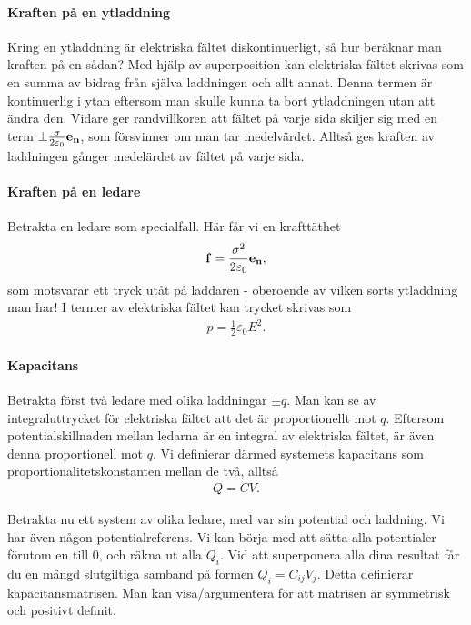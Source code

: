 \paragraph{Kraften på en ytladdning}
Kring en ytladdning är elektriska fältet diskontinuerligt, så hur beräknar man kraften på en sådan? Med hjälp av superposition kan elektriska fältet skrivas som en summa av bidrag från själva laddningen och allt annat. Denna termen är kontinuerlig i ytan eftersom man skulle kunna ta bort ytladdningen utan att ändra den. Vidare ger randvillkoren att fältet på varje sida skiljer sig med en term $\pm\frac{\sigma}{2\varepsilon_{0}}\vb{e}_{\vb{n}}$, som försvinner om man tar medelvärdet. Alltså ges kraften av laddningen gånger medelärdet av fältet på varje sida.

\paragraph{Kraften på en ledare}
Betrakta en ledare som specialfall. Här får vi en krafttäthet
\begin{align*}
	\vb{f}  = \frac{\sigma^{2}}{2\varepsilon_{0}}\vb{e}_{\vb{n}},
\end{align*}
som motsvarar ett tryck utåt på laddaren - oberoende av vilken sorts ytladdning man har! I termer av elektriska fältet kan trycket skrivas som
\begin{align*}
	p = \frac{1}{2}\varepsilon_{0}E^{2}.
\end{align*}

\paragraph{Kapacitans}
Betrakta först två ledare med olika laddningar $\pm q$. Man kan se av integraluttrycket för elektriska fältet att det är proportionellt mot $q$. Eftersom potentialskillnaden mellan ledarna är en integral av elektriska fältet, är även denna proportionell mot $q$. Vi definierar därmed systemets kapacitans som proportionalitetskonstanten mellan de två, alltså
\begin{align*}
	Q = CV.
\end{align*}

Betrakta nu ett system av olika ledare, med var sin potential och laddning. Vi har även någon potentialreferens. Vi kan börja med att sätta alla potentialer förutom en till $0$, och räkna ut alla $Q_{i}$. Vid att superponera alla dina resultat får du en mängd slutgiltiga samband på formen $Q_{i} = C_{ij}V_{j}$. Detta definierar kapacitansmatrisen. Man kan visa/argumentera för att matrisen är symmetrisk och positivt definit.

